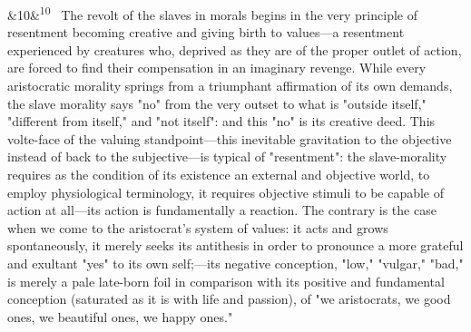 \documentclass[12pt]{article}
\newcommand{\para}[1][]{\par\noindent\ifx&#1&\else\textsuperscript{\footnotesize #1}~\fi}
\begin{document}
\para[10] The revolt of the slaves in morals begins in the very principle of resentment becoming creative and giving birth to values---a resentment experienced by creatures who, deprived as they are of the proper outlet of action, are forced to find their compensation in an imaginary revenge. While every aristocratic morality springs from a triumphant affirmation of its own demands, the slave morality says "no" from the very outset to what is "outside itself," "different from itself," and "not itself": and this "no" is its creative deed. This volte-face of the valuing standpoint---this inevitable gravitation to the objective instead of back to the subjective---is typical of "resentment": the slave-morality requires as the condition of its existence an external and objective world, to employ physiological terminology, it requires objective stimuli to be capable of action at all---its action is fundamentally a reaction. The contrary is the case when we come to the aristocrat's system of values: it acts and grows spontaneously, it merely seeks its antithesis in order to pronounce a more grateful and exultant "yes" to its own self;---its negative conception, "low," "vulgar," "bad," is merely a pale late-born foil in comparison with its positive and fundamental conception (saturated as it is with life and passion), of "we aristocrats, we good ones, we beautiful ones, we happy ones."
\end{document}
